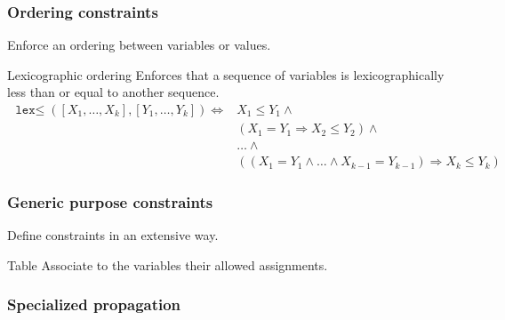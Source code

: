 \subsubsection{Ordering constraints}

Enforce an ordering between variables or values.

\begin{descriptionlist}
    \item[Lexicographic ordering] 
        Enforces that a sequence of variables is lexicographically less than or equal to another sequence.
        \[ 
            \begin{split}
                \texttt{lex$\leq$}([X_1, \dots, X_k], [Y_1, \dots, Y_k]) \iff & X_1 \leq Y_1 \land \\
                &(X_1 = Y_1 \Rightarrow X_2 \leq Y_2) \land \\
                & \dots \land \\
                &((X_1 = Y_1 \land \dots \land X_{k-1} = Y_{k-1}) \Rightarrow X_k \leq Y_k)
            \end{split}
        \]
\end{descriptionlist}


\subsubsection{Generic purpose constraints}

Define constraints in an extensive way.

\begin{descriptionlist}
    \item[Table]
        Associate to the variables their allowed assignments.
\end{descriptionlist}


\subsubsection{Specialized propagation}

